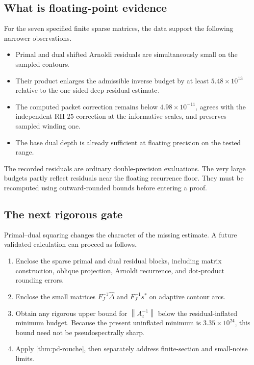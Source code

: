 \documentclass[11pt]{article}
\theoremstyle{definition}
\theoremstyle{remark}
\newcommand{\norm}[1]{\left\lVert#1\right\rVert}
\begin{document}
\subsection{What is floating-point evidence}

For the seven specified finite sparse matrices, the data support the
following narrower observations.

\begin{itemize}
 \item Primal and dual shifted Arnoldi residuals are simultaneously small on
 the sampled contours.
 \item Their product enlarges the admissible inverse budget by at least
 \(5.48\times10^{13}\) relative to the one-sided deep-residual estimate.
 \item The computed packet correction remains below
 \(4.98\times10^{-11}\), agrees with the independent RH-25 correction at
 the informative scales, and preserves sampled winding one.
 \item The base dual depth is already sufficient at floating precision on
 the tested range.
\end{itemize}

The recorded residuals are ordinary double-precision evaluations.  The
very large budgets partly reflect residuals near the floating recurrence
floor.  They must be recomputed using outward-rounded bounds before entering
a proof.

\subsection{The next rigorous gate}

Primal--dual squaring changes the character of the missing estimate.  A
future validated calculation can proceed as follows.

\begin{enumerate}
 \item Enclose the sparse primal and dual residual blocks, including matrix
 construction, oblique projection, Arnoldi recurrence, and dot-product
 rounding errors.
 \item Enclose the small matrices \(F_J^{-1}\widehat\Delta\) and
 \(F_J^{-1}s^*\) on adaptive contour arcs.
 \item Obtain any rigorous upper bound for \(\norm{A_z^{-1}}\) below the
 residual-inflated minimum budget.  Because the present uninflated minimum
 is \(3.35\times10^{24}\), this bound need not be pseudospectrally sharp.
 \item Apply \cref{thm:pd-rouche}, then separately address finite-section
 and small-noise limits.
\end{enumerate}
\end{document}
